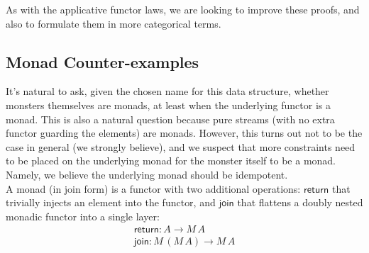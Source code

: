 
As with the applicative functor laws, we are looking to improve these proofs, and also to formulate them in more categorical terms.


%

\subsection{Monad Counter-examples}

It's natural to ask, given the chosen name for this data structure, whether monsters themselves are monads, at least when the underlying functor is a monad. This is also a natural question because pure streams (with no extra functor guarding the elements) are monads. However, this turns out not to be the case in general (we strongly believe), and we suspect that more constraints need to be placed on the underlying monad for the monster itself to be a monad. Namely, we believe the underlying monad should be idempotent. \\

A monad (in join form) is a functor with two additional operations: $\mathsf{return}$ that trivially injects an element into the functor, and $\mathsf{join}$ that flattens a doubly nested monadic functor into a single layer: 
$$
\begin{array}{l}
\mathsf{return} : A \to M\,A\\
\mathsf{join} : M\,(M\,A) \to M\,A
\end{array}
$$

